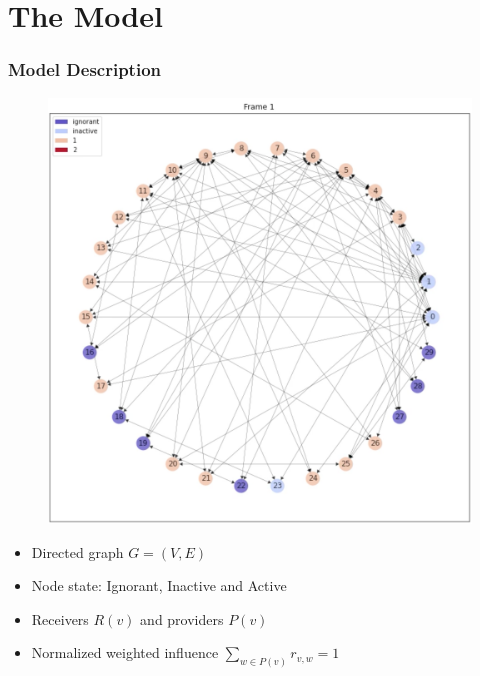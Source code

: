 \documentclass{beamer}
\begin{document}
\section{The Model}
\begin{frame}
\frametitle{Model Description}

\begin{center}
\begin{figure}
\includegraphics[scale=0.2]{images/frame_example.png}
\end{figure}
\end{center}

\begin{itemize}
\item<1-> Directed graph $G = (V,E)$
\item<2-> Node state: Ignorant, Inactive and Active
\item<3-> Receivers $R(v)$ and providers $P(v)$
\item<4-> Normalized weighted influence $\sum_{w \in P(v)} r_{v,w} = 1$
\end{itemize}

\end{frame}
\end{document}
